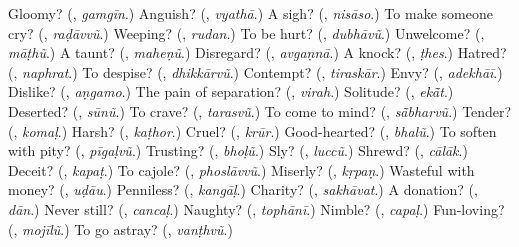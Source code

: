 \begin{tcolorbox}[breakable,colback=teal!4,colframe=teal!35!black,title={Before you move on}]
Gloomy? (\textbf{}, \emph{gamgīn}.) Anguish? (\textbf{}, \emph{vyathā}.) A sigh? (\textbf{}, \emph{nisāso}.) To make someone cry? (\textbf{}, \emph{raḍāvvũ}.) Weeping? (\textbf{}, \emph{rudan}.) To be hurt? (\textbf{}, \emph{dubhāvũ}.) Unwelcome? (\textbf{}, \emph{māṭhũ}.) A taunt? (\textbf{}, \emph{maheṇũ}.) Disregard? (\textbf{}, \emph{avgaṇnā}.) A knock? (\textbf{}, \emph{ṭhes}.) Hatred? (\textbf{}, \emph{naphrat}.) To despise? (\textbf{}, \emph{dhikkārvũ}.) Contempt? (\textbf{}, \emph{tiraskār}.) Envy? (\textbf{}, \emph{adekhāī}.) Dislike? (\textbf{}, \emph{aṇgamo}.) The pain of separation? (\textbf{}, \emph{virah}.) Solitude? (\textbf{}, \emph{ekā̃t}.) Deserted? (\textbf{}, \emph{sūnũ}.) To crave? (\textbf{}, \emph{tarasvũ}.) To come to mind? (\textbf{}, \emph{sā̃bharvũ}.) Tender? (\textbf{}, \emph{komaḷ}.) Harsh? (\textbf{}, \emph{kaṭhor}.) Cruel? (\textbf{}, \emph{krūr}.) Good-hearted? (\textbf{}, \emph{bhalũ}.) To soften with pity? (\textbf{}, \emph{pīgaḷvũ}.) Trusting? (\textbf{}, \emph{bhoḷũ}.) Sly? (\textbf{}, \emph{luccũ}.) Shrewd? (\textbf{}, \emph{cālāk}.) Deceit? (\textbf{}, \emph{kapaṭ}.) To cajole? (\textbf{}, \emph{phoslāvvũ}.) Miserly? (\textbf{}, \emph{kṛpaṇ}.) Wasteful with money? (\textbf{}, \emph{uḍāu}.) Penniless? (\textbf{}, \emph{kangāḷ}.) Charity? (\textbf{}, \emph{sakhāvat}.) A donation? (\textbf{}, \emph{dān}.) Never still? (\textbf{}, \emph{cancaḷ}.) Naughty? (\textbf{}, \emph{tophānī}.) Nimble? (\textbf{}, \emph{capaḷ}.) Fun-loving? (\textbf{}, \emph{mojīlũ}.) To go astray? (\textbf{}, \emph{vanṭhvũ}.)
\end{tcolorbox}
